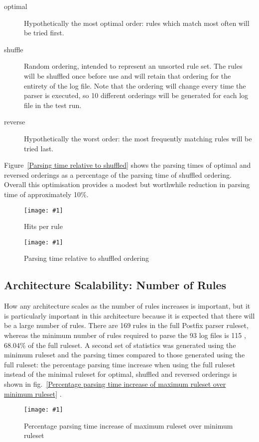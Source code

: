 \documentclass[draft]{svmult}
\newcommand{\showgraph}[3]{%
    \begin{figure}[hbtp]%
        \caption{#2}\label{#3}%
        \texttt{[image: \#1]}%
    \end{figure}%
}
\newcommand{\refwithlabel}[2]{%
    #1~\vref{#2}%
}
\newcommand{\graphref}[1]{%
    \refwithlabel{fig.}{#1}%
}
\newcommand{\Graphref}[1]{%
    \refwithlabel{Figure}{#1}%
}
\newcommand{\numberOFlogFILES}[0]{%
    93%
}
\newcommand{\numberOFrules}[0]{%
    169%
}
\newcommand{\numberOFrulesMINIMUM}[0]{%
    115%
}
\newcommand{\numberOFrulesMINIMUMpercentage}[0]{%
    68.04\%%
}
\begin{document}
\begin{description}

    \item [optimal]  Hypothetically the most optimal order: rules which
        match most often will be tried first.

    \item [shuffle] Random ordering, intended to represent an unsorted rule
        set.  The rules will be shuffled once before use and will retain
        that ordering for the entirety of the log file.  Note that the
        ordering will change every time the parser is executed, so 10
        different orderings will be generated for each log file in the test
        run.

    \item [reverse] Hypothetically the worst order: the most frequently
        matching rules will be tried last.

\end{description}

\Graphref{Parsing time relative to shuffled} shows the parsing times of
optimal and reversed orderings as a percentage of the parsing time of
shuffled ordering.  Overall this optimisation provides a modest but
worthwhile reduction in parsing time of approximately 10\%.
\showgraph{build/graph-hits}{Hits per rule}{rule hits graph}
\showgraph{build/graph-optimal-and-reverse-vs-shuffle}{Parsing time
relative to shuffled ordering}{Parsing time relative to shuffled}

\subsection{Architecture Scalability: Number of Rules}

How any architecture scales as the number of rules increases is important,
but it is particularly important in this architecture because it is
expected that there will be a large number of rules.  There are
\numberOFrules{} rules in the full Postfix parser ruleset, whereas the
minimum number of rules required to parse the \numberOFlogFILES{} log files
is \numberOFrulesMINIMUM{}, \numberOFrulesMINIMUMpercentage{} of the full
ruleset.  A second set of statistics was generated using the minimum
ruleset and the parsing times compared to those generated using the full
ruleset: the percentage parsing time increase when using the full ruleset
instead of the minimal ruleset for optimal, shuffled and reversed orderings
is shown in \graphref{Percentage parsing time increase of maximum ruleset
over minimum ruleset}.
\showgraph{build/graph-full-ruleset-vs-minimum-ruleset}{Percentage parsing
time increase of maximum ruleset over minimum ruleset}{Percentage parsing
time increase of maximum ruleset over minimum ruleset}
\end{document}
